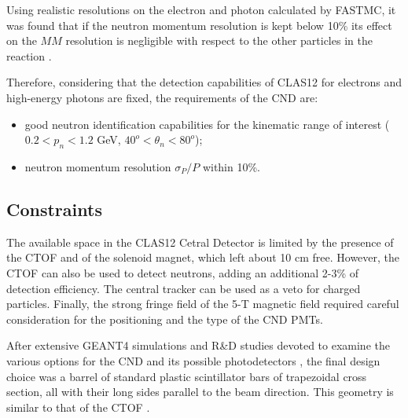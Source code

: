 %
Using realistic resolutions on the electron and photon calculated by FASTMC, it was found that if the neutron momentum resolution is kept below 10\% its effect on the $MM$ resolution is negligible with respect to the other particles in the reaction \cite{Niccolai:2018qzm}. 

Therefore, considering that the detection capabilities of CLAS12 for electrons and high-energy photons are fixed, the requirements of the CND are:
\begin{itemize}
\item{good neutron identification capabilities for the kinematic range of interest ($0.2<p_n<1.2$ GeV, $40^o<\theta_n<80^o$);}
\item{neutron momentum resolution $\sigma_P/P$ within 10\%.}
\end{itemize}

\subsection{Constraints}
\label{sect_constraints}
The available space in the CLAS12 Cetral Detector is limited by the presence of the CTOF and of the solenoid magnet, which left about 10 cm free. 
However, the CTOF can also be used to detect neutrons, adding an additional 2-3\% of detection efficiency. 
The central tracker can be used as a veto for charged particles.
Finally, the strong fringe field of the 5-T magnetic field required careful consideration for the positioning and the type of the CND PMTs.


After extensive GEANT4 simulations and R\&D studies devoted to examine the various options for the CND and its possible photodetectors \cite{Niccolai:2018qzm}, the final design choice was a barrel of standard plastic scintillator bars of trapezoidal cross section, all with their long sides parallel to the beam direction. This geometry is similar to that of the CTOF \cite{ctofref}. 

